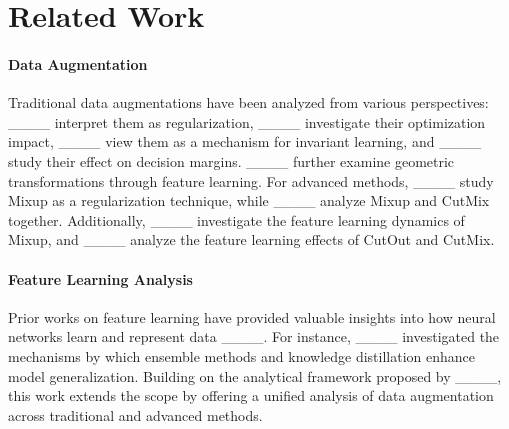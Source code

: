 \section{Related Work}
\paragraph{Data Augmentation} Traditional data augmentations have been analyzed from various perspectives: ____ interpret them as regularization, ____ investigate their optimization impact, ____ view them as a mechanism for invariant learning, and ____ study their effect on decision margins. ____ further examine geometric transformations through feature learning. For advanced methods, ____ study Mixup as a regularization technique, while ____ analyze Mixup and CutMix together. Additionally, ____ investigate the feature learning dynamics of Mixup, and ____ analyze the feature learning effects of CutOut and CutMix.


\paragraph{Feature Learning Analysis}
Prior works on feature learning have provided valuable insights into how neural networks learn and represent data ____. For instance, ____ investigated the mechanisms by which ensemble methods and knowledge distillation enhance model generalization.
Building on the analytical framework proposed by ____, this work extends the scope by offering a unified analysis of data augmentation across traditional and advanced methods.